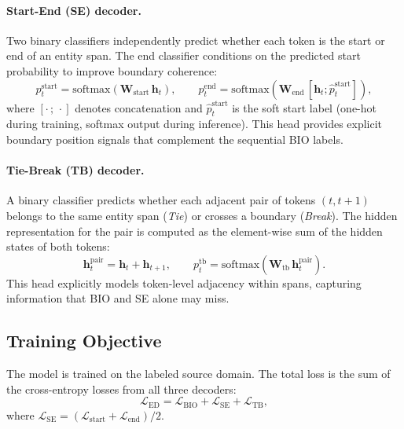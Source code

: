 \documentclass[14pt]{extreport}
\begin{document}
\paragraph{Start-End (SE) decoder.}
Two binary classifiers independently predict whether each token is the start or end of an entity span. The end classifier conditions on the predicted start probability to improve boundary coherence:
\begin{equation}
    p^{\text{start}}_t = \text{softmax}(\mathbf{W}_{\text{start}}\,\mathbf{h}_t), \qquad
    p^{\text{end}}_t = \text{softmax}(\mathbf{W}_{\text{end}}\,[\mathbf{h}_t; \hat{p}^{\text{start}}_t]),
    \label{eq:se}
\end{equation}
where $[\cdot\,;\,\cdot]$ denotes concatenation and $\hat{p}^{\text{start}}_t$ is the soft start label (one-hot during training, softmax output during inference). This head provides explicit boundary position signals that complement the sequential BIO labels.

\paragraph{Tie-Break (TB) decoder.}
A binary classifier predicts whether each adjacent pair of tokens $(t, t{+}1)$ belongs to the same entity span (\textit{Tie}) or crosses a boundary (\textit{Break}). The hidden representation for the pair is computed as the element-wise sum of the hidden states of both tokens:
\begin{equation}
    \mathbf{h}^{\text{pair}}_t = \mathbf{h}_t + \mathbf{h}_{t+1}, \qquad
    p^{\text{tb}}_t = \text{softmax}(\mathbf{W}_{\text{tb}}\,\mathbf{h}^{\text{pair}}_t).
    \label{eq:tb}
\end{equation}
This head explicitly models token-level adjacency within spans, capturing information that BIO and SE alone may miss.

\subsection{Training Objective}

The model is trained on the labeled source domain. The total loss is the sum of the cross-entropy losses from all three decoders:
\begin{equation}
    \mathcal{L}_{\text{ED}} = \mathcal{L}_{\text{BIO}} + \mathcal{L}_{\text{SE}} + \mathcal{L}_{\text{TB}},
    \label{eq:ed_loss}
\end{equation}
where $\mathcal{L}_{\text{SE}} = (\mathcal{L}_{\text{start}} + \mathcal{L}_{\text{end}}) / 2$.
\end{document}
